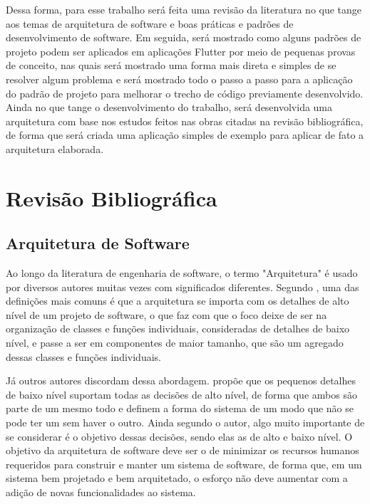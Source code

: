 \documentclass[12pt, %
openright, 
oneside, %
a4paper,    %
brazil]{facom-ufu-abntex2}
\begin{document}
Dessa forma, para esse trabalho será feita uma revisão da literatura no que tange aos temas de arquitetura de software e boas práticas e padrões de desenvolvimento de software. Em seguida, será mostrado como alguns padrões de projeto podem ser aplicados em aplicações Flutter por meio de pequenas provas de conceito, nas quais será mostrado uma forma mais direta e simples de se resolver algum problema e será mostrado todo o passo a passo para a aplicação do padrão de projeto para melhorar o trecho de código previamente desenvolvido. Ainda no que tange o desenvolvimento do trabalho, será desenvolvida uma arquitetura com base nos estudos feitos nas obras citadas na revisão bibliográfica, de forma que será criada uma aplicação simples de exemplo para aplicar de fato a arquitetura elaborada.

\chapter{Revisão Bibliográfica}

\section{Arquitetura de Software}
Ao longo da literatura de engenharia de software, o termo "Arquitetura" é usado por diversos autores muitas vezes com significados diferentes. Segundo , uma das definições mais comuns é que a arquitetura se importa com os detalhes de alto nível de um projeto de software, o que faz com que o foco deixe de ser na organização de classes e funções individuais, consideradas de detalhes de baixo nível, e passe a ser em componentes de maior tamanho, que são um agregado dessas classes e funções individuais.

Já outros autores discordam dessa abordagem.  propõe que os pequenos detalhes de baixo nível suportam todas as decisões de alto nível, de forma que ambos são parte de um mesmo todo e definem a forma do sistema de um modo que não se pode ter um sem haver o outro. Ainda segundo o autor, algo muito importante de se considerar é o objetivo dessas decisões, sendo elas as de alto e baixo nível. O objetivo da arquitetura de software deve ser o de minimizar os recursos humanos requeridos para construir e manter um sistema de software, de forma que, em um sistema bem projetado e bem arquitetado, o esforço não deve aumentar com a adição de novas funcionalidades ao sistema.
\end{document}
